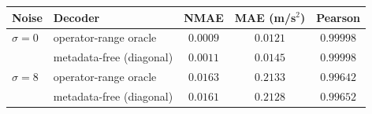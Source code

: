 \begin{tabular}{llccc}
\toprule
Noise & Decoder & NMAE & MAE (m/s$^2$) & Pearson \\
\midrule
$\sigma=0$ & operator-range oracle      & $0.0009$ & $0.0121$ & $0.99998$ \\
            & metadata-free (diagonal)   & $0.0011$ & $0.0145$ & $0.99998$ \\
$\sigma=8$ & operator-range oracle      & $0.0163$ & $0.2133$ & $0.99642$ \\
            & metadata-free (diagonal)   & $0.0161$ & $0.2128$ & $0.99652$ \\
\bottomrule
\end{tabular}
